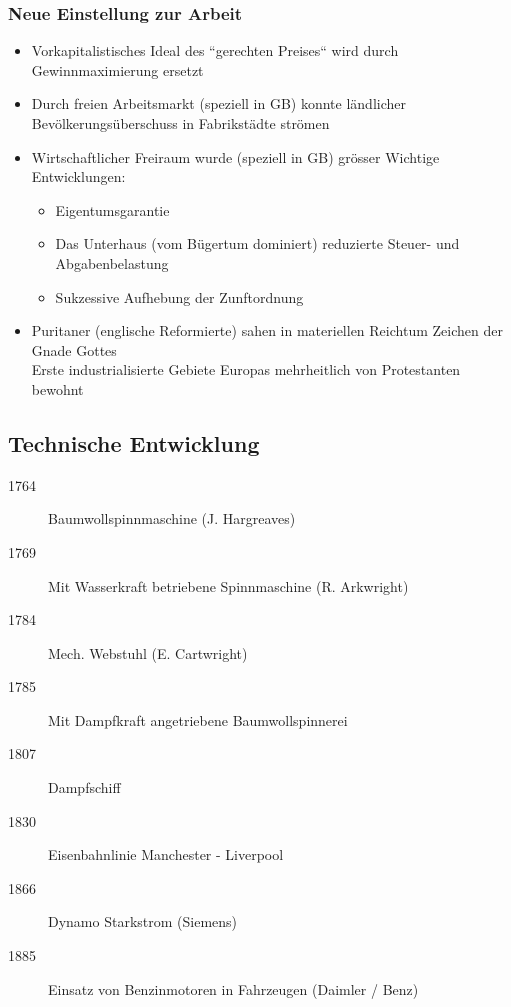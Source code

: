 \documentclass{report}
\begin{document}
\subsubsection{Neue Einstellung zur Arbeit}
\begin{itemize}
	\item Vorkapitalistisches Ideal des ``gerechten Preises`` wird durch Gewinnmaximierung ersetzt
	\item Durch freien Arbeitsmarkt (speziell in GB) konnte ländlicher Bevölkerungsüberschuss in Fabrikstädte strömen
	\item Wirtschaftlicher Freiraum wurde (speziell in GB) grösser 
		\arrow Wichtige Entwicklungen:
		\begin{itemize}
			\item Eigentumsgarantie
			\item Das Unterhaus (vom Bügertum dominiert) reduzierte Steuer- und Abgabenbelastung 
			\item Sukzessive Aufhebung der Zunftordnung
		\end{itemize}
	\item Puritaner (englische Reformierte) sahen in materiellen Reichtum Zeichen der Gnade Gottes\\
	Erste industrialisierte Gebiete Europas mehrheitlich von Protestanten bewohnt

\end{itemize}

\subsection{Technische Entwicklung}
\begin{description}
	\item[1764] Baumwollspinnmaschine (J. Hargreaves)
	\item[1769] Mit Wasserkraft betriebene Spinnmaschine (R. Arkwright)
	\item[1784] Mech. Webstuhl (E. Cartwright)
	\item[1785] Mit Dampfkraft angetriebene Baumwollspinnerei
	\item[1807] Dampfschiff
	\item[1830] Eisenbahnlinie Manchester - Liverpool
	\item[1866] Dynamo Starkstrom (Siemens)
	\item[1885] Einsatz von Benzinmotoren in Fahrzeugen (Daimler / Benz)
\end{description}

\newpage
\end{document}
